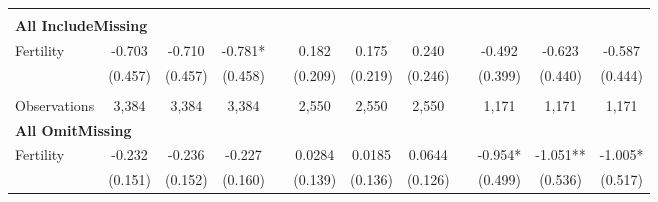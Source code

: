 \begin{landscape}
\begin{table}[htpb!]
\begin{center}
\begin{tabular}{lcccp{2mm}cccp{2mm}ccc}
\begin{footnotesize}\end{footnotesize}\\ 
\multicolumn{12}{l}{\textbf{All IncludeMissing}}\\ 
Fertility&-0.703&-0.710&-0.781*&&0.182&0.175&0.240&&-0.492&-0.623&-0.587\\
&(0.457)&(0.457)&(0.458)&&(0.209)&(0.219)&(0.246)&&(0.399)&(0.440)&(0.444)\\
\begin{footnotesize}\end{footnotesize}&\begin{footnotesize}\end{footnotesize}&\begin{footnotesize}\end{footnotesize}&\begin{footnotesize}\end{footnotesize}&\begin{footnotesize}\end{footnotesize}&\begin{footnotesize}\end{footnotesize}&\begin{footnotesize}\end{footnotesize}&\begin{footnotesize}\end{footnotesize}&\begin{footnotesize}\end{footnotesize}&\begin{footnotesize}\end{footnotesize}&\begin{footnotesize}\end{footnotesize}&\begin{footnotesize}\end{footnotesize}\\Observations&3,384&3,384&3,384&&2,550&2,550&2,550&&1,171&1,171&1,171\\
\multicolumn{12}{l}{\textbf{All OmitMissing}}\\ 
Fertility&-0.232&-0.236&-0.227&&0.0284&0.0185&0.0644&&-0.954*&-1.051**&-1.005*\\
&(0.151)&(0.152)&(0.160)&&(0.139)&(0.136)&(0.126)&&(0.499)&(0.536)&(0.517)\\

\end{tabular}
\end{center}
\end{table}
\end{landscape}

